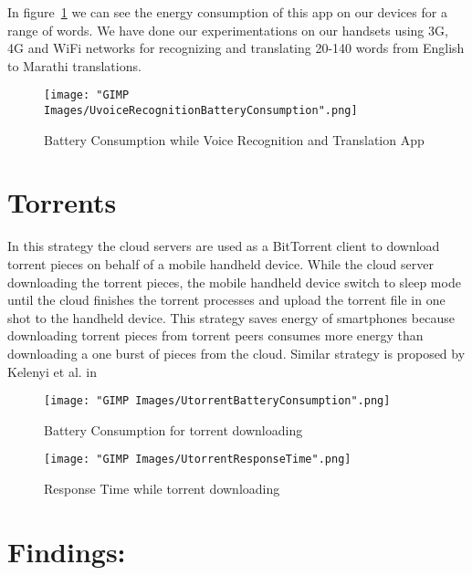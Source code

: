 \documentclass{report}
\begin{document}
In figure~\ref{fig:UvoiceRecognitionBatteryConsumption} we can see the energy consumption of this app on our devices for a range of words. 
We have done our experimentations on our handsets using 3G, 4G and WiFi networks for recognizing and translating 20-140 words from English to Marathi translations. 


\begin{figure}[h]
  \centering
  \texttt{[image: "GIMP Images/UvoiceRecognitionBatteryConsumption".png]}
  \caption{Battery Consumption while Voice Recognition and Translation App}
  \label{fig:UvoiceRecognitionBatteryConsumption}
\end{figure}

\section{Torrents}
In this strategy the cloud servers are used as a BitTorrent client to download torrent pieces on behalf of a mobile handheld device.
While the cloud server downloading the torrent pieces, the mobile handheld device switch to sleep mode until the cloud finishes the torrent processes and upload the torrent file in one shot to the handheld device. This strategy saves energy of smartphones
because downloading torrent pieces from torrent peers consumes more energy than downloading a one
burst of pieces from the cloud. Similar strategy is proposed by Kelenyi et al. in \cite{kelenyi2010cloudtorrent}


\begin{figure}[h!]
  \centering
  \texttt{[image: "GIMP Images/UtorrentBatteryConsumption".png]}
  \caption{Battery Consumption for torrent downloading}
  \label{fig:UtorrentBatteryConsumption}
\end{figure}

\begin{figure}[h!]
  \centering
  \texttt{[image: "GIMP Images/UtorrentResponseTime".png]}
  \caption{Response Time while torrent downloading}
  \label{fig:UtorrentResponseTime}
\end{figure}

\section{Findings:}
\end{document}

